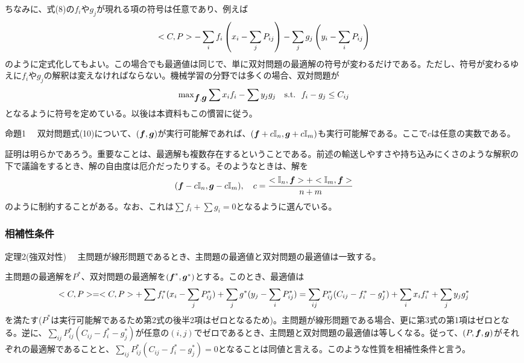 \documentclass[dvipdfmx, 9pt, a4paper]{jsarticle}
\newcommand{\bm}[1]{{\mbox{\boldmath $#1$}}}
\begin{document}
ちなみに、式(8)の$f_i$や$g_j$が現れる項の符号は任意であり、例えば
\begin{equation}
<C, P>-\sum_if_i\left(x_i-\sum_jP_{ij}\right)-\sum_jg_j\left(y_i-\sum_iP_{ij}\right) \notag
\end{equation}
のように定式化してもよい。この場合でも最適値は同じで、単に双対問題の最適解の符号が変わるだけである。ただし、符号が変わるゆえに$f_i$や$g_j$の解釈は変えなければならない。機械学習の分野では多くの場合、双対問題が
\begin{equation}
{\rm max}_{\bm f, \bm g}\sum x_if_i-\sum y_jg_j~~~{\rm s.t.}~~f_i - g_j \leq C_{ij}
\end{equation}
となるように符号を定めている。以後は本資料もこの慣習に従う。
\begin{itembox}[l]{命題1}
　双対問題式(10)について、$(\bm f, \bm g)$が実行可能解であれば、$(\bm f+c\mathbb{I}_n, \bm g+c\mathbb{I}_m)$も実行可能解である。ここで$c$は任意の実数である。
\end{itembox}\par
証明は明らかであろう。重要なことは、最適解も複数存在するということである。前述の輸送しやすさや持ち込みにくさのような解釈の下で議論をするとき、解の自由度は厄介だったりする。そのようなときは、解を
\begin{equation}
(\bm f-c\mathbb{I}_n, \bm g-c\mathbb{I}_m),~~~c=\frac{<\mathbb{I}_n, \bm f>+<\mathbb{I}_m, \bm f>}{n+m}
\end{equation}
のように制約することがある。なお、これは$\sum f_i+\sum g_i=0$となるように選んでいる。

\subsubsection{相補性条件}
\begin{itembox}[l]{定理2(強双対性)}
　主問題が線形問題であるとき、主問題の最適値と双対問題の最適値は一致する。
\end{itembox}\par
主問題の最適解を$P^*$、双対問題の最適解を$(\bm f^*, \bm g^*)$とする。このとき、最適値は
\begin{equation}
<C, P>=<C, P> + \sum f^*_i(x_i - \sum_jP^*_{ij})+\sum_jg^*(y_j-\sum_iP^*_{ij})=\sum_{ij}P^*_{ij}(C_{ij}-f^*_i-g^*_j)+\sum_i x_if^*_i+\sum_j y_jg^*_j \notag
\end{equation}
を満たす($P^*$は実行可能解であるため第2式の後半2項はゼロとなるため)。主問題が線形問題である場合、更に第3式の第1項はゼロとなる。逆に、$\sum_{ij}P^*_{ij}(C_{ij}-f^*_i-g^*_j)$が任意の$(i, j)$でゼロであるとき、主問題と双対問題の最適値は等しくなる。従って、$(P, \bm f, \bm g)$がそれぞれの最適解であることと、$\sum_{ij}P^*_{ij}(C_{ij}-f^*_i-g^*_j)=0$となることは同値と言える。このような性質を相補性条件と言う。\par
\end{document}
